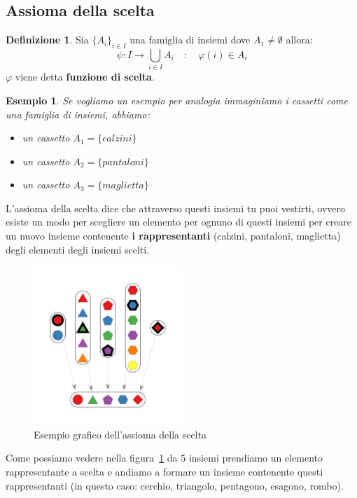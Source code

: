 \documentclass{article}
\newtheorem{exmp}{Esempio}[section]
\theoremstyle{definition}
\newtheorem{definition}{Definizione}[section]
\begin{document}
\subsection{Assioma della scelta}\label{sec:assioma_della_scelta}
\begin{definition}
        Sia $ {\{A_i\}}_{i \in I} $ una famiglia di insiemi dove $ A_1 \not = \emptyset $ allora:
        \begin{equation*}
                \psi : I \to \bigcup_{i \in I}A_i \quad : \quad  \varphi(i) \in A_i 
        \end{equation*}
        $ \varphi $ viene detta \textbf{funzione di scelta}.
\end{definition}

\begin{exmp}
Se vogliamo un esempio per analogia immaginiamo i cassetti come una famiglia di insiemi, abbiamo:
\begin{itemize}
        \item un cassetto $ A_1 = \{calzini\} $ 
        \item un cassetto $ A_2 = \{pantaloni\} $ 
        \item un cassetto $ A_3 = \{maglietta\} $ 
\end{itemize}
\end{exmp}
L'assioma della scelta dice che attraverso questi insiemi tu puoi vestirti, ovvero esiste un modo per scegliere un elemento per ognuno di questi insiemi  per creare un nuovo insieme contenente \textbf{i rappresentanti} (calzini, pantaloni, maglietta) degli elementi degli insiemi scelti.

\newpage
\begin{figure}[!h]
        \centering
                \includegraphics[width=0.5\textwidth]{esempio_assioma_della_scelta.jpg}
                \caption{Esempio grafico dell'assioma della scelta}\label{fig:esempio_assioma_della_scelta}
\end{figure}
Come possiamo vedere nella figura~\ref{fig:esempio_assioma_della_scelta} da 5 insiemi prendiamo un elemento rappresentante a scelta e andiamo a formare un insieme contenente questi rappresentanti (in questo caso: cerchio, triangolo, pentagono, esagono, rombo).
\end{document}
